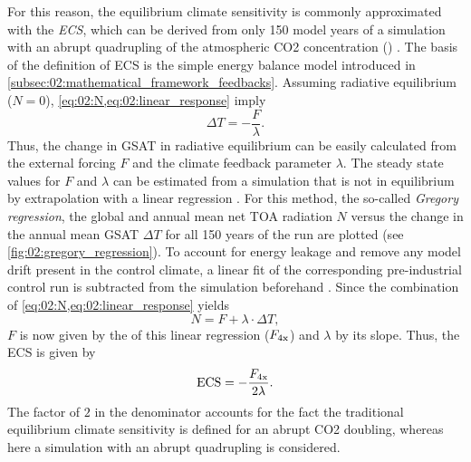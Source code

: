 For this reason, the equilibrium climate sensitivity is commonly approximated
with the \emph{\acf{ECS}}, which can be derived from only 150 model years of a
simulation with an abrupt quadrupling of the atmospheric \ac{CO2} concentration
() \autocite{Gregory2004}. The basis of the definition of \ac{ECS}
is the simple energy balance model introduced in
\cref{subsec:02:mathematical_framework_feedbacks}. Assuming radiative
equilibrium ($N = 0$), \cref{eq:02:N,eq:02:linear_response} imply
\begin{equation}
  \Delta T = -\frac{F}{\lambda}.
  \label{eq:02:delta_t_eq}
\end{equation}
Thus, the change in \ac{GSAT} in radiative equilibrium can be easily calculated
from the external forcing $F$ and the climate feedback parameter $\lambda$. The
steady state values for $F$ and $\lambda$ can be estimated from a 
simulation that is not in equilibrium by extrapolation with a linear regression
\autocite{Gregory2004}. For this method, the so-called \emph{Gregory
  regression}, the global and annual mean net \ac{TOA} radiation $N$ versus the
change in the annual mean \ac{GSAT} $\Delta T$ for all 150 years of the
 run are plotted (see \cref{fig:02:gregory_regression}). To account
for energy leakage and remove any model drift present in the control climate, a
linear fit of the corresponding pre-industrial control run is subtracted from
the  simulation beforehand \autocite{Andrews2012}. Since the
combination of \cref{eq:02:N,eq:02:linear_response} yields
\begin{equation}
  N = F + \lambda \cdot \Delta T,
  \label{eq:02:N_vs_delta_t}
\end{equation}
$F$ is now given by the \yintercept{} of this linear regression
($F_{\textnormal{4x}}$) and $\lambda$ by its slope. Thus, the \ac{ECS} is given by
\begin{equation}
  \textnormal{ECS} = -\frac{F_{\textnormal{4x}}}{2 \lambda}.
  \label{eq:02:ecs}
\end{equation}
The factor of $2$ in the denominator accounts for the fact the traditional
equilibrium climate sensitivity is defined for an abrupt \ac{CO2} doubling,
whereas here a simulation with an abrupt quadrupling is considered.

